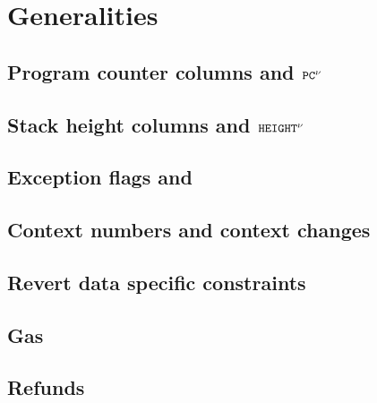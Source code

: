 
\section{Generalities}                                                                           \label{hub: generalities}
\subsection{Program counter columns \pc{} and $\texttt{PC}^{\nu}$                            \lispDone{}}  \label{hub: generalities: program counter}                                 
\subsection{Stack height columns \height{} and $\texttt{HEIGHT}^{\nu}$                       }  \label{hub: generalities: stack height}                                     %
\subsection{Exception flags and \XAHOY{}                                           \lispDone{}}  \label{hub: generalities: exceptions}                                      
\subsection{Context numbers and context changes                                    \lispDone{}}  \label{hub: generalities: context changes}                                 
\subsection{Revert data specific constraints                                       \lispDone{}}  \label{hub: generalities: revert}                                          
\subsection{Gas                                                                    }  \label{hub: generalities: gas}                                              %
\subsection{Refunds                                                                }  \label{hub: generalities: refunds}                                          %
